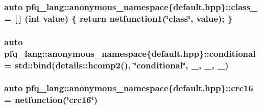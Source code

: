 \hypertarget{namespacepfq__lang_1_1anonymous__namespace_02default_8hpp_03_a27a683ef93570a66844e1a0106e6336a}{
\subsubsection[{class\-\_\-}]{\setlength{\rightskip}{0pt plus 5cm}auto pfq\-\_\-lang\-::anonymous\-\_\-namespace\{default.\-hpp\}\-::class\-\_\- = \mbox{[}$\,$\mbox{]} (int value) \{ return {\bf netfunction1}(\char`\"{}class\char`\"{}, value); \}}}\label{namespacepfq__lang_1_1anonymous__namespace_02default_8hpp_03_a27a683ef93570a66844e1a0106e6336a}
\hypertarget{namespacepfq__lang_1_1anonymous__namespace_02default_8hpp_03_a022d0075edf2fff575b93377aec0c228}{
\subsubsection[{conditional}]{\setlength{\rightskip}{0pt plus 5cm}auto pfq\-\_\-lang\-::anonymous\-\_\-namespace\{default.\-hpp\}\-::conditional = std\-::bind(details\-::hcomp2(), \char`\"{}conditional\char`\"{}, \-\_, \-\_, \-\_)}}\label{namespacepfq__lang_1_1anonymous__namespace_02default_8hpp_03_a022d0075edf2fff575b93377aec0c228}
\hypertarget{namespacepfq__lang_1_1anonymous__namespace_02default_8hpp_03_aaa12e1daf6bd2719a3b8592e673acf84}{
\subsubsection[{crc16}]{\setlength{\rightskip}{0pt plus 5cm}auto pfq\-\_\-lang\-::anonymous\-\_\-namespace\{default.\-hpp\}\-::crc16 = {\bf netfunction}(\char`\"{}crc16\char`\"{})}}\label{namespacepfq__lang_1_1anonymous__namespace_02default_8hpp_03_aaa12e1daf6bd2719a3b8592e673acf84}
